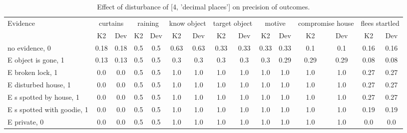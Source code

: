 \begin{table}\begin{tabular}{l|cc|cc|cc|cc|cc|cc|cc}\toprule\multirow{2}{*}{Evidence} & \multicolumn{2}{c}{curtains}& \multicolumn{2}{c}{raining}& \multicolumn{2}{c}{know object}& \multicolumn{2}{c}{target object}& \multicolumn{2}{c}{motive}& \multicolumn{2}{c}{compromise house}& \multicolumn{2}{c}{flees startled}\\& {K2} & {Dev}& {K2} & {Dev}& {K2} & {Dev}& {K2} & {Dev}& {K2} & {Dev}& {K2} & {Dev}& {K2} & {Dev}\\\midrule
no evidence, 0 & 0.18&0.18&0.5&0.5&0.63&0.63&0.33&0.33&0.33&0.33&0.1&0.1&0.16&0.16\\E object is gone, 1 & 0.13&0.13&0.5&0.5&0.3&0.3&0.3&0.3&0.3&0.29&0.29&0.29&0.08&0.08\\E broken lock, 1 & 0.0&0.0&0.5&0.5&1.0&1.0&1.0&1.0&1.0&1.0&1.0&1.0&0.27&0.27\\E disturbed house, 1 & 0.0&0.0&0.5&0.5&1.0&1.0&1.0&1.0&1.0&1.0&1.0&1.0&0.27&0.27\\E s spotted by house, 1 & 0.0&0.0&0.5&0.5&1.0&1.0&1.0&1.0&1.0&1.0&1.0&1.0&0.27&0.27\\E s spotted with goodie, 1 & 0.0&0.0&0.5&0.5&1.0&1.0&1.0&1.0&1.0&1.0&1.0&1.0&0.19&0.19\\E private, 0 & 0.0&0.0&0.5&0.5&1.0&1.0&1.0&1.0&1.0&1.0&1.0&1.0&0.0&0.0\\\bottomrule\end{tabular}\caption{Effect of disturbance of [4, 'decimal places'] on precision of outcomes.}\end{table}